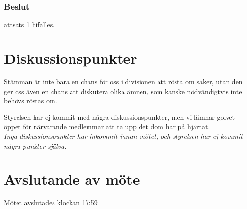 \documentclass[protokoll]{dvd}
\begin{document}
\subsubsection*{Beslut}
\begin{attsatser}
    \item attsats 1 bifalles.
\end{attsatser}

\section{Diskussionspunkter}
Stämman är inte bara en chans för oss i divisionen att rösta om saker, utan den ger oss även en chans att diskutera olika ämnen, som kanske nödvändigtvis inte behövs röstas om.

Styrelsen har ej kommit med några diskussionspunkter, men vi lämnar golvet öppet för närvarande medlemmar att ta upp det dom har på hjärtat.\\

\textit{Inga diskussionspunkter har inkommit innan mötet, och styrelsen har ej kommit några punkter själva.}

\section{Avslutande av möte}

Mötet avslutades klockan 17:59

\end{document}
